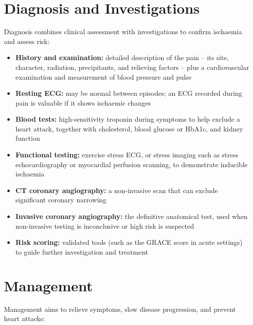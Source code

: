 \section*{Diagnosis and Investigations}
Diagnosis combines clinical assessment with investigations to confirm ischaemia and assess risk:

\begin{itemize}
    \item \textbf{History and examination:} detailed description of the pain -- its site, character, radiation, precipitants, and relieving factors -- plus a cardiovascular examination and measurement of blood pressure and pulse
    \item \textbf{Resting ECG:} may be normal between episodes; an ECG recorded during pain is valuable if it shows ischaemic changes
    \item \textbf{Blood tests:} high-sensitivity troponin during symptoms to help exclude a heart attack, together with cholesterol, blood glucose or HbA1c, and kidney function
    \item \textbf{Functional testing:} exercise stress ECG, or stress imaging such as stress echocardiography or myocardial perfusion scanning, to demonstrate inducible ischaemia
    \item \textbf{CT coronary angiography:} a non-invasive scan that can exclude significant coronary narrowing
    \item \textbf{Invasive coronary angiography:} the definitive anatomical test, used when non-invasive testing is inconclusive or high risk is suspected
    \item \textbf{Risk scoring:} validated tools (such as the GRACE score in acute settings) to guide further investigation and treatment
\end{itemize}

\section*{Management}
Management aims to relieve symptoms, slow disease progression, and prevent heart attacks:


